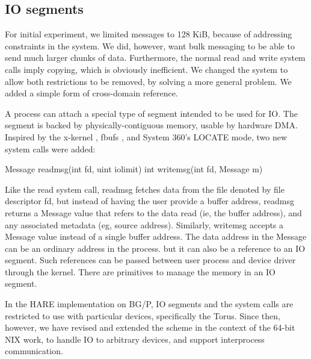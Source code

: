 \subsection{IO segments}

For initial experiment, we limited messages to 128 KiB, because of
addressing constraints in the system. We did, however, want bulk
messaging to be able to send much larger chunks of data.  Furthermore,
the normal read and write system calls imply copying, which is
obviously inefficient.  We changed the system to allow both
restrictions to be removed, by solving a more general problem. We
added a simple form of cross-domain reference.

A process can attach a special type of segment intended to be used for
IO.  The segment is backed by physically-contiguous memory, usable by
hardware DMA.  Inspired by the x-kernel \cite{x-kernel}, fbufs
\cite{fbufs}, and System 360's LOCATE mode, two new system calls were
added:


\begin{center}
      Message readmsg(int fd, uint iolimit)
      int writemsg(int fd, Message m)
\end{center}

Like the read system call, readmsg fetches data from the file denoted by file descriptor fd,
but instead of having the user provide a buffer address, readmsg returns a Message value
that refers to the data read (ie, the buffer address), and any associated metadata (eg, source address). Similarly, writemsg accepts a Message value instead of a single buffer address.
The data address in the Message can be an ordinary address in the process.
but it can also be a reference to an IO segment.
Such references can be passed between user process and device driver through the kernel.
There are primitives to manage the memory in an IO segment.

In the HARE implementation on BG/P, IO segments and the system calls are restricted to use with particular devices, specifically the Torus.
Since then, however, we have revised and extended the scheme in the context of the 64-bit NIX work,
to handle IO to arbitrary devices, and support interprocess communication.
